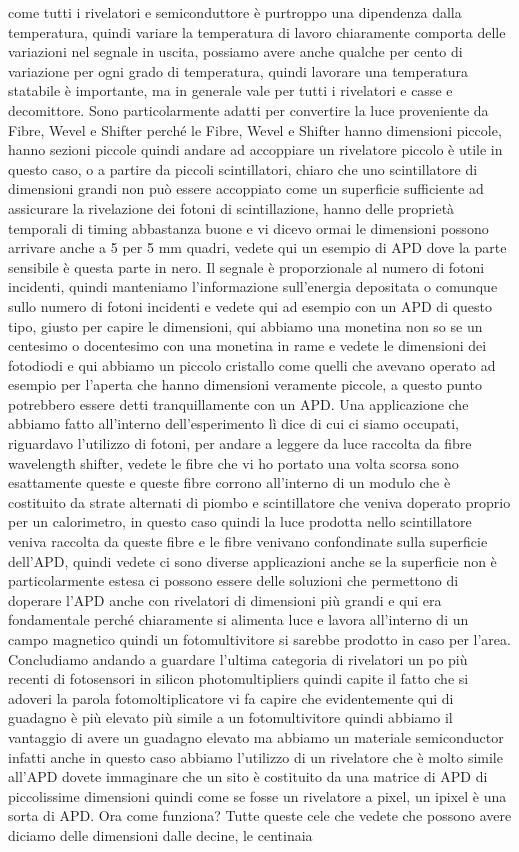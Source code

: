 {come tutti i rivelatori e semiconduttore è purtroppo una dipendenza dalla temperatura, quindi variare la temperatura di lavoro chiaramente comporta delle variazioni nel segnale in uscita, possiamo avere anche qualche per cento di variazione per ogni grado di temperatura, quindi lavorare una temperatura statabile è importante, ma in generale vale per tutti i rivelatori e casse e decomittore. Sono particolarmente adatti per convertire la luce proveniente da Fibre, Wevel e Shifter perché le Fibre, Wevel e Shifter hanno dimensioni piccole, hanno sezioni piccole quindi andare ad accoppiare un rivelatore piccolo è utile in questo caso, o a partire da piccoli scintillatori, chiaro che uno scintillatore di dimensioni grandi non può essere accoppiato come un superficie sufficiente ad assicurare la rivelazione dei fotoni di scintillazione, hanno delle proprietà temporali di timing abbastanza buone e vi dicevo ormai le dimensioni possono arrivare anche a 5 per 5 mm quadri, vedete qui un esempio di APD dove la parte sensibile è questa parte in nero. Il segnale è proporzionale al numero di fotoni incidenti, quindi manteniamo l'informazione sull'energia depositata o comunque sullo numero di fotoni incidenti e vedete qui ad esempio con un APD di questo tipo, giusto per capire le dimensioni, qui abbiamo una monetina non so se un centesimo o docentesimo con una monetina in rame e vedete le dimensioni dei fotodiodi e qui abbiamo un piccolo cristallo come quelli che avevano operato ad esempio per l'aperta che hanno dimensioni veramente piccole, a questo punto potrebbero essere detti tranquillamente con un APD. Una applicazione che abbiamo fatto all'interno dell'esperimento lì dice di cui ci siamo occupati, riguardavo l'utilizzo di fotoni, per andare a leggere da luce raccolta da fibre wavelength shifter, vedete le fibre che vi ho portato una volta scorsa sono esattamente queste e queste fibre corrono all'interno di un modulo che è costituito da strate alternati di piombo e scintillatore che veniva doperato proprio per un calorimetro, in questo caso quindi la luce prodotta nello scintillatore veniva raccolta da queste fibre e le fibre venivano confondinate sulla superficie dell'APD, quindi vedete ci sono diverse applicazioni anche se la superficie non è particolarmente estesa ci possono essere delle soluzioni che permettono di doperare l'APD anche con rivelatori di dimensioni più grandi e qui era fondamentale perché chiaramente si alimenta luce e lavora all'interno di un campo magnetico quindi un fotomultivitore si sarebbe prodotto in caso per l'area. Concludiamo andando a guardare l'ultima categoria di rivelatori un po più recenti di fotosensori in silicon photomultipliers quindi capite il fatto che si adoveri la parola fotomoltiplicatore vi fa capire che evidentemente qui di guadagno è più elevato più simile a un fotomultivitore quindi abbiamo il vantaggio di avere un guadagno elevato ma abbiamo un materiale semiconductor infatti anche in questo caso abbiamo l'utilizzo di un rivelatore che è molto simile all'APD dovete immaginare che un sito è costituito da una matrice di APD di piccolissime dimensioni quindi come se fosse un rivelatore a pixel, un ipixel è una sorta di APD. Ora come funziona? Tutte queste cele che vedete che possono avere diciamo delle dimensioni dalle decine, le centinaia }
